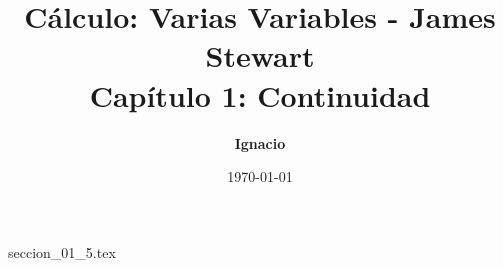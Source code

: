 \documentclass[11pt,spanish,oneside]{report}
\title{\textbf{Cálculo: Varias Variables - James Stewart} \\ \Large Capítulo 1: Continuidad}
\author{\textbf{Ignacio}}
\date{\today}
\begin{document}
\maketitle

{seccion_01_5.tex}
\end{document}
